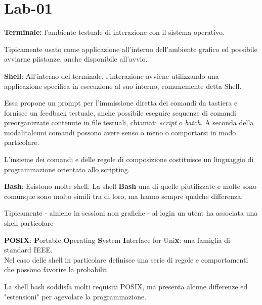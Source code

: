 \section{Lab-01}
\begin{flushleft}
  \textbf{Terminale:} \ace l'ambiente testuale di interazione con il sistema operativo. \par Tipicamente usato come
  applicazione all'interno dell'ambiente grafico ed \ace possibile avviarne pi\acu istanze, \ace anche disponibile all'avvio. 
\end{flushleft}
\begin{flushleft}
  \textbf{Shell}: All'interno del terminale, l'interazione avviene utilizzando una applicazione specifica in esecuzione 
  al suo interno, comunemente detta Shell. \par 
  Essa propone un prompt per l'immissione diretta dei comandi da tastiera e fornisce un feedback testuale, \ace anche possibile 
  eseguire sequenze di comandi preorganizzate contenute in file testuali, chiamati \textit{script} o \textit{batch}.
  A seconda della modalit\aca alcuni comandi possono avere senso o meno o comportarsi in modo particolare.\par \par
  L'insieme dei comandi e delle regole di composizione costituisce un linguaggio di programmazione orientato allo scripting. 
\end{flushleft}
\begin{flushleft}
  \textbf{Bash}: Esistono molte shell. La shell \textbf{Bash} \ace una di quelle pi\acu utilizzate e molte sono comunque sono molto simili 
  tra di loro, ma hanno sempre qualche differenza. \par
  Tipicamente - almeno in sessioni non grafiche - al login un utent ha associata una shell particolare
\end{flushleft}
\begin{flushleft}
  \textbf{POSIX}: \textbf{P}ortable \textbf{O}perating \textbf{S}ystem \textbf{I}nterface for Uni\textbf{x}: \ace una famiglia  di standard IEEE.\\
  Nel caso delle shell in particolare definisce una serie di regole e comportamenti  che possono favorire la probabilit\aca \par 
  La shell bash soddisfa molti requisiti POSIX, ma presenta alcune differenze ed "estensioni" per agevolare la programmazione. 
\end{flushleft}
